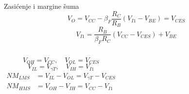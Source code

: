 \begin{frame}[label=10-s017]{Zasićenje i margine šuma}
\setlength{\abovedisplayskip}{4pt}\setlength{\belowdisplayskip}{4pt}\setlength{\abovedisplayshortskip}{3pt}\setlength{\belowdisplayshortskip}{3pt}
\[V_O=V_{CC}-\beta_F\frac{R_C}{R_B}(V_{I1}-V_{BE})=V_{CES}\]
\[V_{I1}=\frac{R_B}{\beta_FR_C}(V_{CC}-V_{CES})+V_{BE}\]
\medskip\begin{columns}[T,onlytextwidth]\centering \[V_{OH}=V_{CC},\quad V_{OL}=V_{CES}\]
\[V_{IL}=V_{\gamma T},\quad V_{IH}=V_{I1}\]
\[\begin{aligned}NM_{LMS}&=V_{IL}-V_{OL}=V_{\gamma T}-V_{CES}\\
NM_{HMS}&=V_{OH}-V_{IH}=V_{CC}-V_{I1}\end{aligned}\]\end{columns}
\end{frame}
